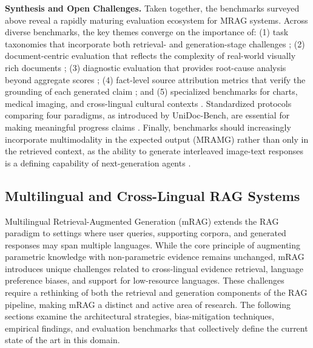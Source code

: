 \documentclass[11pt]{article}
\begin{document}
\textbf{Synthesis and Open Challenges.} Taken together, the benchmarks surveyed above reveal a rapidly maturing evaluation ecosystem for MRAG systems. Across diverse benchmarks, the key themes converge on the importance of: (1) task taxonomies that incorporate both retrieval- and generation-stage challenges \cite{ref356,ref357}; (2) document-centric evaluation that reflects the complexity of real-world visually rich documents \cite{ref358,ref359}; (3) diagnostic evaluation that provides root-cause analysis beyond aggregate scores \cite{ref364}; (4) fact-level source attribution metrics that verify the grounding of each generated claim \cite{ref365}; and (5) specialized benchmarks for charts, medical imaging, and cross-lingual cultural contexts \cite{ref366,ref367,ref368}. Standardized protocols comparing four paradigms, as introduced by UniDoc-Bench, are essential for making meaningful progress claims \cite{ref358}. Finally, benchmarks should increasingly incorporate multimodality in the expected output (MRAMG) rather than only in the retrieved context, as the ability to generate interleaved image-text responses is a defining capability of next-generation agents \cite{ref361}.

\subsection{Multilingual and Cross-Lingual RAG Systems}

Multilingual Retrieval-Augmented Generation (mRAG) extends the RAG paradigm to settings where user queries, supporting corpora, and generated responses may span multiple languages. While the core principle of augmenting parametric knowledge with non-parametric evidence remains unchanged, mRAG introduces unique challenges related to cross-lingual evidence retrieval, language preference biases, and support for low-resource languages. These challenges require a rethinking of both the retrieval and generation components of the RAG pipeline, making mRAG a distinct and active area of research. The following sections examine the architectural strategies, bias-mitigation techniques, empirical findings, and evaluation benchmarks that collectively define the current state of the art in this domain.
\end{document}
